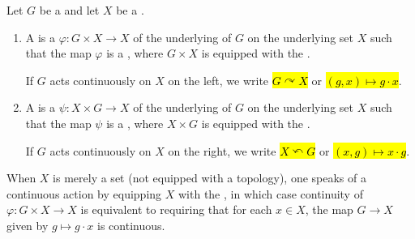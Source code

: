 \begin{definition} \label{definition:continuous_action_on_a_topological_space_by_a_topological_group}
Let $G$ be a  and let $X$ be a .

\begin{enumerate}
    \item A  is a  $\varphi : G \times X \to X$ of the underlying  of $G$ on the underlying set $X$ such that the map $\varphi$ is a , where $G \times X$ is equipped with the .

    If $G$ acts continuously on $X$ on the left, we write \hl{$G \curvearrowright X$} or \hl{$(g,x) \mapsto g \cdot x$}.

    \item A  is a  $\psi : X \times G \to X$ of the underlying  of $G$ on the underlying set $X$ such that the map $\psi$ is a , where $X \times G$ is equipped with the .

    If $G$ acts continuously on $X$ on the right, we write \hl{$X \curvearrowleft G$} or \hl{$(x,g) \mapsto x \cdot g$}.
\end{enumerate}

When $X$ is merely a set (not equipped with a topology), one speaks of a continuous action by equipping $X$ with the , in which case continuity of $\varphi : G \times X \to X$ is equivalent to requiring that for each $x \in X$, the map $G \to X$ given by $g \mapsto g \cdot x$ is continuous.
\end{definition}
